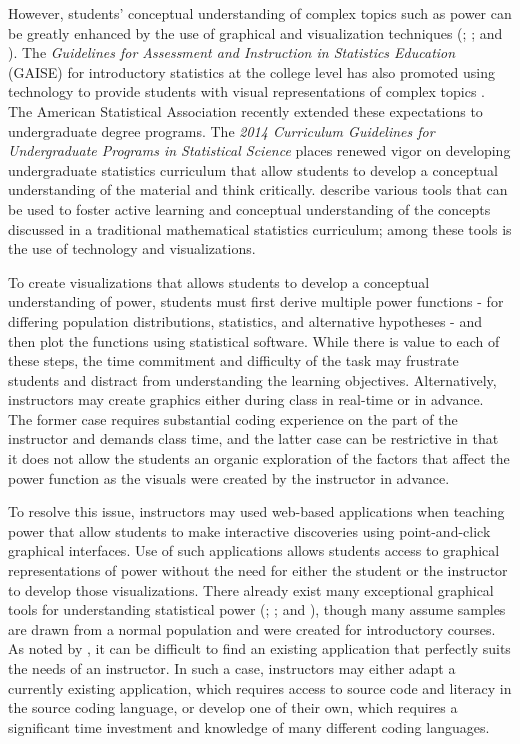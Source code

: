 \documentclass{TISE}
\begin{document}
However, students' conceptual understanding of complex topics such as power can be greatly enhanced by the use of graphical and visualization techniques (\cite{chance2007}; \cite{delMas1999}; and \cite{bobek2016}). The \textit{Guidelines for Assessment and Instruction in Statistics Education} (GAISE) for introductory statistics at the college level has also promoted using technology to provide students with visual representations of complex topics \citep{ASA2005}. The American Statistical Association recently extended these expectations to undergraduate degree programs. The \textit{2014 Curriculum Guidelines for Undergraduate Programs in Statistical Science} \citep{ASA2014} places renewed vigor on developing undergraduate statistics curriculum that allow students to develop a conceptual understanding of the material and think critically. \cite{green2015} describe various tools that can be used to foster active learning and conceptual understanding of the concepts discussed in a traditional mathematical statistics curriculum; among these tools is the use of technology and visualizations.

To create visualizations that allows students to develop a conceptual understanding of power, students must first derive multiple power functions - for differing population distributions, statistics, and alternative hypotheses - and then plot the functions using statistical software. While there is value to each of these steps, the time commitment and difficulty of the task may frustrate students and distract from understanding the learning objectives. Alternatively, instructors may create graphics either during class in real-time or in advance. The former case requires substantial coding experience on the part of the instructor and demands class time, and the latter case can be restrictive in that it does not allow the students an organic exploration of the factors that affect the power function as the visuals were created by the instructor in advance.

To resolve this issue, instructors may used web-based applications when teaching power that allow students to make interactive discoveries using point-and-click graphical interfaces. Use of such applications allows students access to graphical representations of power without the need for either the student or the instructor to develop those visualizations. There already exist many exceptional graphical tools for understanding statistical power (\cite{aberson2002}; \cite{andersoncook2003}; and \cite{rossman2004}), though many assume samples are drawn from a normal population and were created for introductory courses. As noted by \cite{doi2016}, it can be difficult to find an existing application that perfectly suits the needs of an instructor. In such a case, instructors may either adapt a currently existing application, which requires access to source code and literacy in the source coding language, or develop one of their own, which requires a significant time investment and knowledge of many different coding languages. 
\end{document}
